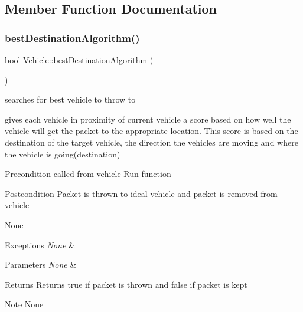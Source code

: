 \subsection{Member Function Documentation}
\hypertarget{class_vehicle_a63f852ddbc0ff5be56cfc830f7482b8f}{}\label{class_vehicle_a63f852ddbc0ff5be56cfc830f7482b8f} 
\subsubsection{\texorpdfstring{best\+Destination\+Algorithm()}{bestDestinationAlgorithm()}}
{\footnotesize\ttfamily bool Vehicle\+::best\+Destination\+Algorithm (\begin{DoxyParamCaption}{ }\end{DoxyParamCaption})}



searches for best vehicle to throw to 

gives each vehicle in proximity of current vehicle a score based on how well the vehicle will get the packet to the appropriate location. This score is based on the destination of the target vehicle, the direction the vehicles are moving and where the vehicle is going(destination)

\begin{DoxyPrecond}{Precondition}
called from vehicle Run function
\end{DoxyPrecond}
\begin{DoxyPostcond}{Postcondition}
\hyperlink{struct_packet}{Packet} is thrown to ideal vehicle and packet is removed from vehicle
\end{DoxyPostcond}
\begin{DoxyParagraph}{None}

\end{DoxyParagraph}

\begin{DoxyExceptions}{Exceptions}
{\em None} & \\
\hline
\end{DoxyExceptions}

\begin{DoxyParams}{Parameters}
{\em None} & \\
\hline
\end{DoxyParams}
\begin{DoxyReturn}{Returns}
Returns true if packet is thrown and false if packet is kept
\end{DoxyReturn}
\begin{DoxyNote}{Note}
None 
\end{DoxyNote}
\hypertarget{class_vehicle_afb6e10a4886f8f1f05f260a550fd8650}{}\label{class_vehicle_afb6e10a4886f8f1f05f260a550fd8650} 
